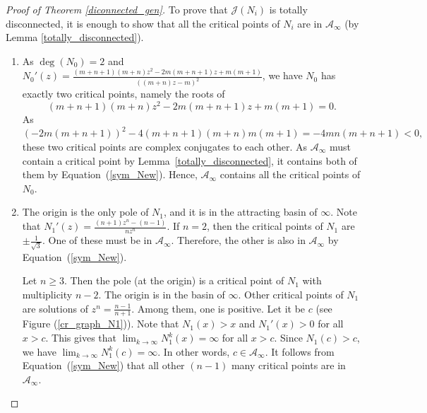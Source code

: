 \documentclass[12pt]{article}
\numberwithin{equation}{section}
\begin{document}
\begin{proof}[Proof of Theorem \ref{diconnected_gen}]
	To prove that $\mathcal{J}(N_i)$ is totally disconnected, it is enough to show that all the critical points of $N_i$ are in $\mathcal{A}_\infty$ (by Lemma \ref{totally_disconnected}).
	\begin{enumerate}
    \item As $\deg(N_0)=2$ and $N_0'(z)=\frac{(m+n+1)(m+n)z^2-2m(m+n+1)z+m(m+1)}{((m+n)z-m)^2}$, we have $N_0$ has exactly two critical points, namely the roots of $$(m+n+1)(m+n)z^2-2m(m+n+1)z+m(m+1)=0.$$ As $(-2m(m+n+1))^2-4(m+n+1)(m+n)m(m+1)=-4mn(m+n+1)<0,$ these two critical points are complex conjugates to each other. As $\mathcal{A}_\infty$ must contain a critical point by Lemma~\ref{totally_disconnected}, it contains both of them by Equation~(\ref{sym_New}). Hence, $\mathcal{A}_\infty$ contains all the critical points of $N_0$.
	\item The origin is the only pole of  $N_1$, and it is in the attracting basin of $\infty$. Note that $N_1'(z)=\frac{(n+1)z^n-(n-1)}{nz^n}$. If $n=2$, then the critical points of $N_1$ are $\pm \frac{1}{\sqrt{3}}$. One of these must be in $\mathcal{A}_\infty$. Therefore, the other is also in $\mathcal{A}_\infty$ by Equation~(\ref{sym_New}). 
	\par Let $n\geq 3$. Then the pole (at the origin) is a critical point of $N_1$ with multiplicity $n-2$. The origin is in the basin of $\infty$. Other critical points of $N_1$ are solutions of $z^n=\frac{n-1}{n+1}$. Among them, one is  positive. Let it be  $c$ (see Figure (\ref{cr_graph_N1})). Note that $N_1(x) >x$ and $N_1 '(x)>0$ for all $x >c$. This gives that  
	$\lim_{k\to \infty}N^k_1(x)=\infty$ for all $x>c$. Since $N_1 (c)>c$, we have $\lim_{k\to \infty}N^k_1(c)=\infty$. In other words, $c \in \mathcal{A}_{\infty}$.
	It follows from Equation~(\ref{sym_New}) that all other $(n-1)$ many critical points are in $\mathcal{A}_\infty$.
	

\end{enumerate}
\end{proof}
\end{document}

